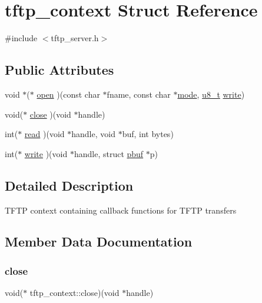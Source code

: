 \hypertarget{structtftp__context}{}\section{tftp\+\_\+context Struct Reference}
\label{structtftp__context}


{\ttfamily \#include $<$tftp\+\_\+server.\+h$>$}

\subsection*{Public Attributes}
\begin{DoxyCompactItemize}
\item 
void $\ast$($\ast$ \hyperlink{structtftp__context_a1115a1fb54634b3e65fe01bb2838daec}{open} )(const char $\ast$fname, const char $\ast$\hyperlink{periph__spi_2main_8c_a500c16f7901299002158783745bc1ab0}{mode}, \hyperlink{group__compiler__abstraction_ga4caecabca98b43919dd11be1c0d4cd8e}{u8\+\_\+t} \hyperlink{structtftp__context_a8e3e7dfc49eb654a57bd465206bd0564}{write})
\item 
void($\ast$ \hyperlink{structtftp__context_a14b36e5bff9ab9fe7a5a5a12894c9f9b}{close} )(void $\ast$handle)
\item 
int($\ast$ \hyperlink{structtftp__context_a8e134df1967ff227a4ec7dde30343b06}{read} )(void $\ast$handle, void $\ast$buf, int bytes)
\item 
int($\ast$ \hyperlink{structtftp__context_a8e3e7dfc49eb654a57bd465206bd0564}{write} )(void $\ast$handle, struct \hyperlink{structpbuf}{pbuf} $\ast$p)
\end{DoxyCompactItemize}


\subsection{Detailed Description}
T\+F\+TP context containing callback functions for T\+F\+TP transfers 

\subsection{Member Data Documentation}
\mbox{\label{structtftp__context_a14b36e5bff9ab9fe7a5a5a12894c9f9b}} 
\subsubsection{\texorpdfstring{close}{close}}
{\footnotesize\ttfamily void($\ast$ tftp\+\_\+context\+::close)(void $\ast$handle)}

